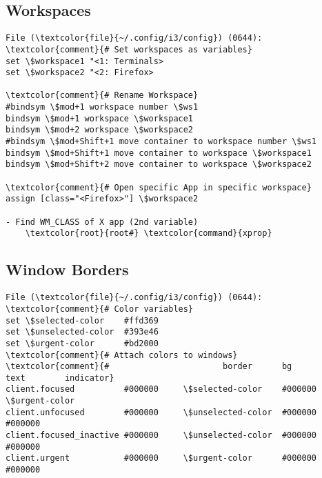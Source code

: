 \documentclass[10pt, a4paper, onecolumn, openany]{book}         %
\begin{document}
\subsection{Workspaces}
\begin{Verbatim}[commandchars=\\\{\}]
File (\textcolor{file}{~/.config/i3/config}) (0644):
\textcolor{comment}{# Set workspaces as variables}
set \$workspace1 "<1: Terminals>
set \$workspace2 "<2: Firefox>

\textcolor{comment}{# Rename Workspace}
#bindsym \$mod+1 workspace number \$ws1
bindsym \$mod+1 workspace \$workspace1
bindsym \$mod+2 workspace \$workspace2
#bindsym \$mod+Shift+1 move container to workspace number \$ws1
bindsym \$mod+Shift+1 move container to workspace \$workspace1
bindsym \$mod+Shift+2 move container to workspace \$workspace2

\textcolor{comment}{# Open specific App in specific workspace}
assign [class="<Firefox>"] \$workspace2

- Find WM_CLASS of X app (2nd variable)
    \textcolor{root}{root#} \textcolor{command}{xprop}
\end{Verbatim}

\subsection{Window Borders}
\begin{Verbatim}[commandchars=\\\{\}]
File (\textcolor{file}{~/.config/i3/config}) (0644):
\textcolor{comment}{# Color variables}
set \$selected-color    #ffd369
set \$unselected-color  #393e46
set \$urgent-color      #bd2000
\textcolor{comment}{# Attach colors to windows}
\textcolor{comment}{#                       border      bg                 text        indicator}
client.focused          #000000     \$selected-color    #000000     \$urgent-color
client.unfocused        #000000     \$unselected-color  #000000     #000000
client.focused_inactive #000000     \$unselected-color  #000000     #000000
client.urgent           #000000     \$urgent-color      #000000     #000000
\end{Verbatim}
\end{document}
